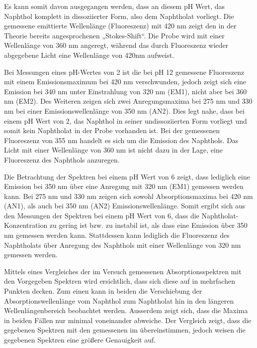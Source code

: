 \documentclass[12pt]{article}
\begin{document}
Es kann somit davon ausgegangen werden, dass an diesem pH Wert, das Naphthol komplett in dissoziierter Form, also dem Naphtholat vorliegt.
Die gemessene emittierte Wellenlänge (Fluoreszenz) mit 420 nm zeigt den in der Theorie bereits angesprochenen „Stokes-Shift“.
Die Probe wird mit einer Wellenlänge von 360 nm angeregt, während das durch Fluoreszenz wieder abgegebene
Licht eine Wellenlänge von 420nm aufweist.


Bei Messungen eines pH-Wertes von 2 ist die bei pH 12 gemessene Fluoreszenz mit einem Emissionsmaximum bei 420 nm verschwunden,
jedoch zeigt sich eine Emission bei 340 nm unter Einstrahlung von 320 nm (EM1), nicht aber bei 360 nm (EM2).
Des Weiteren zeigen sich zwei Anregungsmaxima bei 275 nm und 330 nm bei einer Emissionswellenlänge von 350 nm (AN2).
Dies legt nahe, dass bei einem pH Wert von 2, das Naphthol in seiner undissoziierten Form vorliegt
und somit kein Naphtholat in der Probe vorhanden ist. Bei der gemessenen Fluoreszenz von 355 nm handelt
es sich um die Emission des Naphthols. Das Licht mit einer Wellenlänge von 360 nm ist nicht dazu in der Lage,
eine Fluoreszenz des Naphthols anzuregen.


Die Betrachtung der Spektren bei einem pH Wert von 6 zeigt, dass lediglich eine Emission bei 350 nm
über eine Anregung mit 320 nm (EM1) gemessen werden kann. Bei 275 nm und 330 nm zeigen sich sowohl Absorptionsmaxima bei 420 nm (AN1), als auch bei 350 nm (AN2) Emissionswellenlänge.
Somit ergibt sich aus den Messungen der Spektren bei einem pH Wert von 6,
dass die Naphtholat-Konzentration zu gering ist bzw. zu instabil ist,
als dass eine Emission über 350 nm gemessen werden kann.
Stattdessen kann lediglich die Fluoreszenz des Naphtholats
über Anregung des Naphthols mit einer Wellenlänge von 320 nm gemessen werden.


Mittels eines Vergleiches der im Versuch gemessenen Absorptionsspektren mit den Vorgegeben Spektren wird ersichtlich,
dass sich diese auf in mehrfachen Punkten decken. Zum einen kann in beiden die Verschiebung der Absorptionswellenlänge
vom Naphthol zum Naphtholat hin in den längeren Wellenlängenbereich beobachtet werden. Ausserdem zeigt sich,
dass die Maxima in beiden Fällen nur minimal voneinander abweiche.
Der Vergleich zeigt, dass die gegebenen Spektren mit den gemessenen im übereinstimmen,
jedoch weisen die gegebenen Spektren eine größere Genauigkeit auf.

\printbibliography
\end{document}
